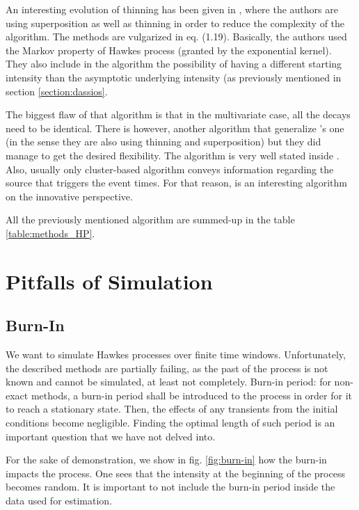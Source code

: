 An interesting evolution of thinning has been given in \cite{simuldassios}, where the authors are using superposition as well as thinning in order to reduce the complexity of the algorithm. The methods are vulgarized in \cite{socialhawkes} eq. (1.19). Basically, the authors used the Markov property of Hawkes process (granted by the exponential kernel). They also include in the algorithm the possibility of having a different starting intensity than the asymptotic underlying intensity (as previously mentioned in section \ref{section:dassios}. 



The biggest flaw of that algorithm is that in the multivariate case, all the decays need to be identical. There is however, another algorithm that generalize \cite{simuldassios}'s one (in the sense they are also using thinning and superposition) but they did manage to get the desired flexibility. The algorithm is very well stated inside \cite{my_algo_simul}. Also, usually only cluster-based algorithm conveys information regarding the source that triggers the event times. For that reason, \cite{my_algo_simul} is an interesting algorithm on the innovative perspective.



All the previously mentioned algorithm are summed-up in the table \ref{table:methods_HP}.


\section{Pitfalls of Simulation}
\subsection{Burn-In}
\label{subsection:burn}
We want to simulate Hawkes processes over finite time windows. Unfortunately, the described methods are partially failing, as the past of the process is not known and cannot be simulated, at least not completely.
Burn-in period: for non-exact methods, a burn-in period shall be introduced to the process in order for it to reach a stationary state. Then, the effects of any transients from the initial conditions become negligible. Finding the optimal length of such period is an important question that we have not delved into.


For the sake of demonstration, we show in fig. \ref{fig:burn-in} how the burn-in impacts the process. One sees that the intensity at the beginning of the process becomes random. It is important to not include the burn-in period inside the data used for estimation. 

